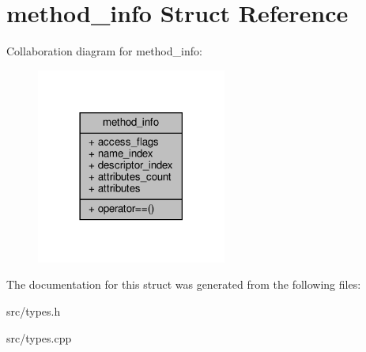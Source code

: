 \hypertarget{structmethod__info}{}\section{method\+\_\+info Struct Reference}
\label{structmethod__info}


Collaboration diagram for method\+\_\+info\+:\nopagebreak
\begin{figure}[H]
\begin{center}
\leavevmode
\includegraphics[width=177pt]{structmethod__info__coll__graph}
\end{center}
\end{figure}


The documentation for this struct was generated from the following files\+:\begin{DoxyCompactItemize}
\item 
src/types.\+h\item 
src/types.\+cpp\end{DoxyCompactItemize}

